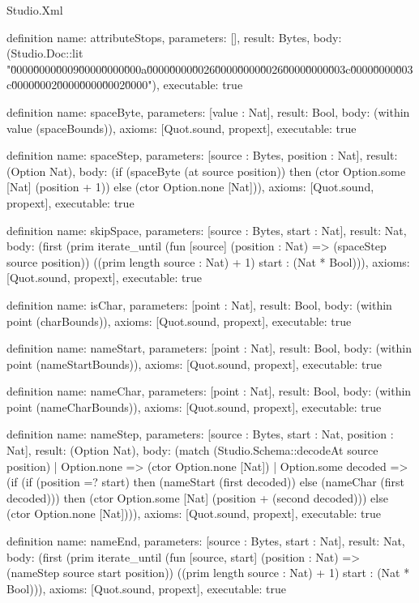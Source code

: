 \begin{lexlean}{Studio.Xml}
\begin{semanticmodule}
definition{
  name: attributeStops,
  parameters: [],
  result: Bytes,
  body: (Studio.Doc::lit "\u0000\u0000\u0009\u0000\u0000\u000a\u0000\u0000\u0026\u0000\u0000\u0026\u0000\u0000\u003c\u0000\u0000\u003c\u0000\u0002\u0000\u0000\u0002\u0000"),
  executable: true
}

definition{
  name: spaceByte,
  parameters: [value : Nat],
  result: Bool,
  body: (within value (spaceBounds)),
  axioms: [Quot.sound, propext],
  executable: true
}

definition{
  name: spaceStep,
  parameters: [source : Bytes, position : Nat],
  result: (Option Nat),
  body: (if (spaceByte (at source position)) then (ctor Option.some [Nat] (position + 1)) else (ctor Option.none [Nat])),
  axioms: [Quot.sound, propext],
  executable: true
}

definition{
  name: skipSpace,
  parameters: [source : Bytes, start : Nat],
  result: Nat,
  body: (first (prim iterate_until (fun [source] (position : Nat) => (spaceStep source position)) ((prim length source : Nat) + 1) start : (Nat * Bool))),
  axioms: [Quot.sound, propext],
  executable: true
}

definition{
  name: isChar,
  parameters: [point : Nat],
  result: Bool,
  body: (within point (charBounds)),
  axioms: [Quot.sound, propext],
  executable: true
}

definition{
  name: nameStart,
  parameters: [point : Nat],
  result: Bool,
  body: (within point (nameStartBounds)),
  axioms: [Quot.sound, propext],
  executable: true
}

definition{
  name: nameChar,
  parameters: [point : Nat],
  result: Bool,
  body: (within point (nameCharBounds)),
  axioms: [Quot.sound, propext],
  executable: true
}

definition{
  name: nameStep,
  parameters: [source : Bytes, start : Nat, position : Nat],
  result: (Option Nat),
  body: (match (Studio.Schema::decodeAt source position)
    | Option.none => (ctor Option.none [Nat])
    | Option.some decoded => (if (if (position =? start) then (nameStart (first decoded)) else (nameChar (first decoded))) then (ctor Option.some [Nat] (position + (second decoded))) else (ctor Option.none [Nat]))),
  axioms: [Quot.sound, propext],
  executable: true
}

definition{
  name: nameEnd,
  parameters: [source : Bytes, start : Nat],
  result: Nat,
  body: (first (prim iterate_until (fun [source, start] (position : Nat) => (nameStep source start position)) ((prim length source : Nat) + 1) start : (Nat * Bool))),
  axioms: [Quot.sound, propext],
  executable: true
}


\end{semanticmodule}
\end{lexlean}

